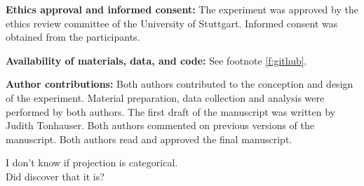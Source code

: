 \documentclass[11pt,fleqn]{article}
\newcommand{\6}{\mbox{$[\hspace*{-.6mm}[$}}
\newcommand{\9}{\mbox{$]\hspace*{-.6mm}]$}}
\newcommand{\citepos}[1]{\citeauthor{#1}'s \citeyear{#1}}
\begin{document}
\bigskip

\noindent
{\bf Ethics approval and informed consent:} The experiment was approved by the ethics review committee of the University of Stuttgart. Informed consent was obtained from the participants.

\bigskip

\noindent
{\bf Availability of materials, data, and code:} See footnote \ref{f:github}.

\bigskip

\noindent
{\bf Author contributions:} Both authors contributed to the conception and design of the experiment. Material preparation, data collection and analysis were performed by both authors. The first draft of the manuscript was written by Judith Tonhauser. Both authors commented on previous versions of the manuscript. Both authors read and approved the final manuscript.

\newpage

\clearpage
{}	

\begin{center}
{\LARGE I don't know if projection is categorical. \\[.2cm] Did \citealt{mandelkern-etal2020} discover that it is?}	
\end{center}

\begin{abstract}

Presuppositions are taken to typically project out of entailment-canceling environments like the scope of negation (e.g., \citealt{ccmg90}). While projection is often characterized as categorical (that is, content either typically projects or not), there is mounting empirical evidence that projection is gradient, with content being more or less projective (e.g., \citealt{karttunen71b,xue-onea11,demarneffe-etal-sub23,tbd-variability,degen-tonhauser-language}). \citealt{mandelkern-etal2020} critically evaluated the inference rating measures on which this empirical evidence is based and claimed that a different measure, namely naturalness ratings in explicit ignorance contexts, provides support for categorical projection and distinguishes presuppositions from nonpresuppositions. This paper presents the results of an experiment designed to investigate \citepos{mandelkern-etal2020} claim for factive predicates (presumed presupposition triggers) and nonfactive ones (nontriggers). The results do not support \citepos{mandelkern-etal2020} claim and rather align with \citepos{degen-tonhauser-language} result that there is no evidence for a categorical distinction between factive and nonfactive predicates. 

\end{abstract}
		
\end{document}
